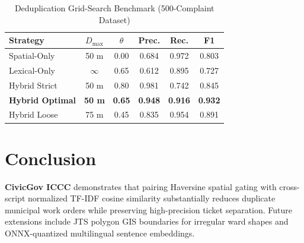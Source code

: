 \documentclass[conference]{IEEEtran}
\begin{document}
\begin{table}[htbp]
\caption{Deduplication Grid-Search Benchmark (500-Complaint Dataset)}
\begin{center}
\begin{tabular}{lccccc}
\toprule
\textbf{Strategy} & $D_{\max}$ & $\theta$ & \textbf{Prec.} & \textbf{Rec.} & \textbf{F1} \\
\midrule
Spatial-Only & 50 m & 0.00 & 0.684 & 0.972 & 0.803 \\
Lexical-Only & $\infty$ & 0.65 & 0.612 & 0.895 & 0.727 \\
Hybrid Strict & 50 m & 0.80 & 0.981 & 0.742 & 0.845 \\
\textbf{Hybrid Optimal} & \textbf{50 m} & \textbf{0.65} & \textbf{0.948} & \textbf{0.916} & \textbf{0.932} \\
Hybrid Loose & 75 m & 0.45 & 0.835 & 0.954 & 0.891 \\
\bottomrule
\end{tabular}
\label{tab1}
\end{center}
\end{table}

\section{Conclusion}
\textbf{CivicGov ICCC} demonstrates that pairing Haversine spatial gating with cross-script normalized TF-IDF cosine similarity substantially reduces duplicate municipal work orders while preserving high-precision ticket separation. Future extensions include JTS polygon GIS boundaries for irregular ward shapes and ONNX-quantized multilingual sentence embeddings.



\end{document}
